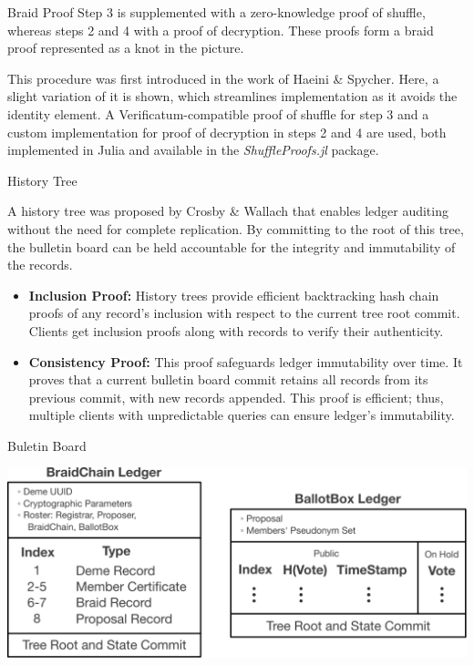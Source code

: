 \documentclass[final]{beamer}
\newlength{\colwidth}
\begin{document}
\begin{frame}[t]
\begin{columns}[t]
\begin{column}{\colwidth}
\begin{block}{Braid Proof}
Step 3 is supplemented with a zero-knowledge proof of shuffle, whereas steps 2 and 4 with a proof of decryption. These proofs form a braid proof represented as a knot in the picture.  

This procedure was first introduced in the work of Haeini \& Spycher. Here, a slight variation of it is shown, which streamlines implementation as it avoids the identity element. A Verificatum-compatible proof of shuffle for step 3 and a custom implementation for proof of decryption in steps 2 and 4 are used, both implemented in Julia and available in the {\it ShuffleProofs.jl} package.
  
\end{block}

\begin{block}{History Tree}

  A history tree was proposed by Crosby \& Wallach that enables ledger auditing without the need for complete replication. By committing to the root of this tree, the bulletin board can be held accountable for the integrity and immutability of the records.
  
  \begin{itemize}
  \item {\bf Inclusion Proof:} History trees provide efficient backtracking hash chain proofs of any record's inclusion with respect to the current tree root commit. Clients get inclusion proofs along with records to verify their authenticity.
  \item {\bf Consistency Proof:} This proof safeguards ledger immutability over time. It proves that a current bulletin board commit retains all records from its previous commit, with new records appended. This proof is efficient; thus, multiple clients with unpredictable queries can ensure ledger's immutability. 
  \end{itemize}
  
\end{block}

\begin{block}{Buletin Board}

  \begin{center}
    \vspace{-0.25cm}
    \includegraphics[width=0.85\colwidth]{figures/buletin-board.pdf}  
    \vspace{-1cm}
  \end{center}
  

\end{block}
\end{column}
\end{columns}
\end{frame}
\end{document}
